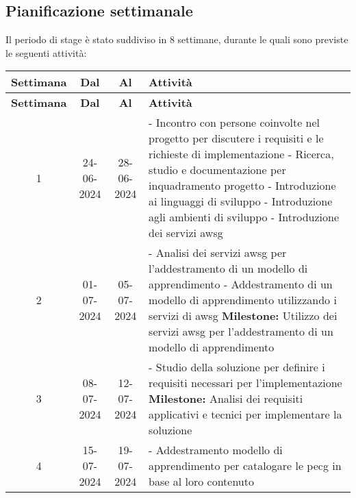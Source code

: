 \subsection{Pianificazione settimanale}
Il periodo di stage è stato suddiviso in 8 settimane, durante le quali sono
previste le seguenti attività:
\begin{longtable}{|c|c|c|p{8cm}|}
    \hline
    \textbf{Settimana} & \textbf{Dal} & \textbf{Al} & \textbf{Attività}                                          \\
    \hline
    \endfirsthead

    \hline
    \textbf{Settimana} & \textbf{Dal} & \textbf{Al} & \textbf{Attività}                                          \\
    \hline
    \endhead

    1                  & 24-06-2024   & 28-06-2024  &
    - Incontro con persone coinvolte nel progetto per discutere i requisiti e le richieste di implementazione \newline
    - Ricerca, studio e documentazione per inquadramento progetto \newline
    - Introduzione ai linguaggi di sviluppo \newline
    - Introduzione agli ambienti di sviluppo \newline
    - Introduzione dei servizi \gls{awsg}                                                                       \\
    \hline
    2                  & 01-07-2024   & 05-07-2024  &
    - Analisi dei servizi \gls{awsg} per l'addestramento di un modello di apprendimento \newline
    - Addestramento di un modello di apprendimento utilizzando i servizi di \gls{awsg} \newline
    \textbf{Milestone:} Utilizzo dei servizi \gls{awsg} per l'addestramento di un modello di apprendimento              \\
    \hline
    3                  & 08-07-2024   & 12-07-2024  &
    - Studio della soluzione per definire i requisiti necessari per l’implementazione \newline
    \textbf{Milestone:} Analisi dei requisiti applicativi e tecnici per implementare la soluzione                \\
    \hline
    4                  & 15-07-2024   & 19-07-2024  &
    - Addestramento modello di apprendimento per catalogare le \gls{pecg} in base al loro contenuto                     \\

\end{longtable}
